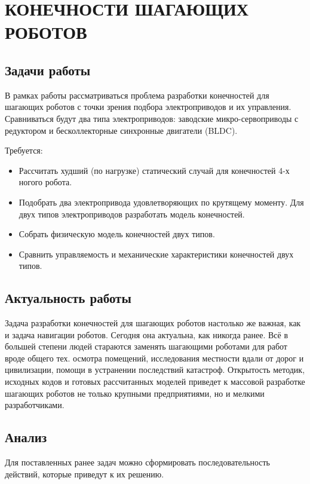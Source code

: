 \chapter{\MakeUppercase{Конечности шагающих роботов}}

\section{Задачи работы}

В рамках работы рассматриваться проблема разработки конечностей для шагающих роботов с точки зрения подбора электроприводов и их управления. Сравниваться будут два типа электроприводов: заводские микро-сервоприводы с редуктором и бесколлекторные синхронные двигатели (BLDC). 

Требуется:
\begin{itemize}
    \item Рассчитать худший (по нагрузке) статический случай для конечностей 4-х ногого робота.
    \item Подобрать два электропривода удовлетворяющих по крутящему моменту. Для двух типов электроприводов разработать модель конечностей.
    \item Собрать физическую модель конечностей двух типов.
    \item Сравнить управляемость и механические характеристики конечностей двух типов.
\end{itemize}

\section{Актуальность работы}

Задача разработки конечностей для шагающих роботов настолько же важная, как и задача навигации роботов. Сегодня она актуальна, как никогда ранее. Всё в большей степени людей стараются заменять шагающими роботами для работ вроде общего тех. осмотра помещений, исследования местности вдали от дорог и цивилизации, помощи в устранении последствий катастроф. Открытость методик, исходных кодов и готовых рассчитанных моделей приведет к массовой разработке шагающих роботов не только крупными предприятиями, но и мелкими разработчиками.

\section{Анализ}

Для поставленных ранее задач можно сформировать последовательность действий, которые приведут к их решению.

